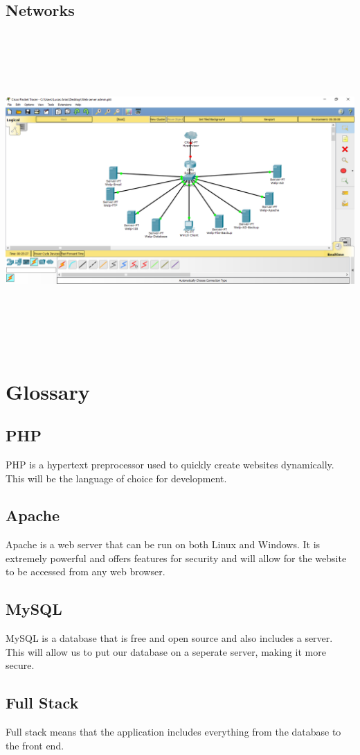\documentclass[12pt]{article}
\begin{document}
        \subsection{Networks}
                \includegraphics[width=15cm, height=12cm]{topology.png}

\newpage
\section{Glossary}
        \subsection{PHP}
                PHP is a hypertext preprocessor used to quickly create websites
                dynamically. This will be the language of choice for development.

        \subsection{Apache}
                Apache is a web server that can be run on both Linux and Windows.
                It is extremely powerful and offers features for security and will
                allow for the website to be accessed from any web browser.

        \subsection{MySQL}
                MySQL is a database that is free and open source and also includes
                a server. This will allow us to put our database on a seperate 
                server, making it more secure.

        \subsection{Full Stack}
                Full stack means that the application includes everything from
                the database to the front end.
\end{document}
